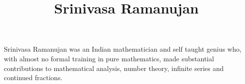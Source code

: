 \documentclass{article}
\title{Srinivasa Ramanujan}
\begin{document}
\maketitle
Srinivasa Ramanujan was an Indian mathematician and
self taught genius who, with almost no formal training
in pure mathematics, made substantial contributions to
mathematical analysis, number theory,
infinite series and continued fractions.
\end{document}
